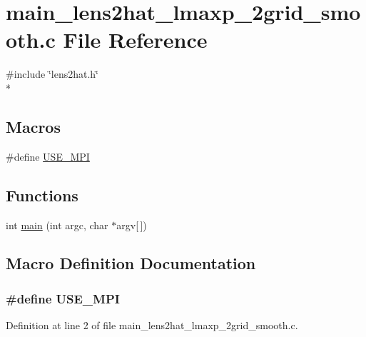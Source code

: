 \section{main\-\_\-lens2hat\-\_\-lmaxp\-\_\-2grid\-\_\-smooth.\-c File Reference}
\label{main__lens2hat__lmaxp__2grid__smooth_8c}
{\ttfamily \#include \char`\"{}lens2hat.\-h\char`\"{}}\\*
\subsection*{Macros}
\begin{DoxyCompactItemize}
\item 
\#define \hyperlink{main__lens2hat__lmaxp__2grid__smooth_8c_a3869d282031f6ea6b50fdb980b758420}{U\-S\-E\-\_\-\-M\-P\-I}
\end{DoxyCompactItemize}
\subsection*{Functions}
\begin{DoxyCompactItemize}
\item 
int \hyperlink{main__lens2hat__lmaxp__2grid__smooth_8c_a0ddf1224851353fc92bfbff6f499fa97}{main} (int argc, char $\ast$argv\mbox{[}$\,$\mbox{]})
\end{DoxyCompactItemize}


\subsection{Macro Definition Documentation}
\subsubsection[{U\-S\-E\-\_\-\-M\-P\-I}]{\setlength{\rightskip}{0pt plus 5cm}\#define U\-S\-E\-\_\-\-M\-P\-I}\label{main__lens2hat__lmaxp__2grid__smooth_8c_a3869d282031f6ea6b50fdb980b758420}


Definition at line 2 of file main\-\_\-lens2hat\-\_\-lmaxp\-\_\-2grid\-\_\-smooth.\-c.



